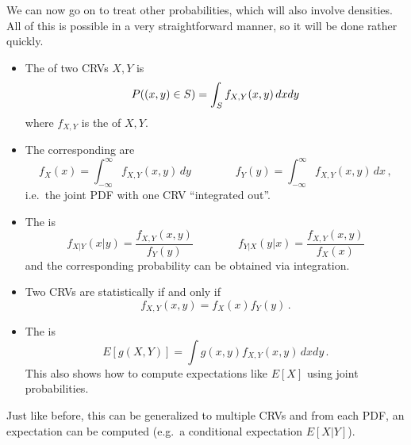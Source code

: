 We can now go on to treat other probabilities, which will also involve densities. All of this is possible in a very straightforward manner, so it will be done rather quickly.
\begin{defi}
\begin{itemize}
\item The  of two CRVs $X, Y$ is
\begin{equation}
P\qty((x, y) \in S) = \int_S f_{X, Y}(x, y) \, dx dy
\end{equation}
where $f_{X, Y}$ is the  of $X, Y$.


\item The corresponding  are
\begin{equation}\label{eq:marginals}
f_X(x) = \int_{- \infty}^\infty f_{X, Y}(x, y) \, dy \qquad \qquad f_Y(y) = \int_{- \infty}^\infty f_{X, Y}(x, y) \, dx \, ,
\end{equation}
i.e.~the joint PDF with one CRV \enquote{integrated out}.


\item The  is
\begin{equation}\label{eq:joint_pdf}
f_{X | Y}(x | y) = \frac{f_{X, Y}(x, y)}{f_Y(y)} \qquad \qquad f_{Y | X}(y | x) = \frac{f_{X, Y}(x, y)}{f_X(x)}
\end{equation}
and the corresponding probability can be obtained via integration.\footnotemark{}


\item Two CRVs are statistically  if and only if
\begin{equation}
f_{X, Y}(x, y) = f_X(x) f_Y(y) \, .
\end{equation}


\item The  is
\begin{equation}\label{eq:unc_stat_crv}
E[g(X, Y)] = \int g(x, y) f_{X, Y}(x, y) \, dx dy \, .
\end{equation}
This also shows how to compute expectations like $E[X]$ using joint probabilities.\footnotemark{}
\end{itemize}

Just like before, this can be generalized to multiple CRVs and from each PDF, an expectation can be computed (e.g.~a conditional expectation $E[X | Y]$).
\end{defi}
